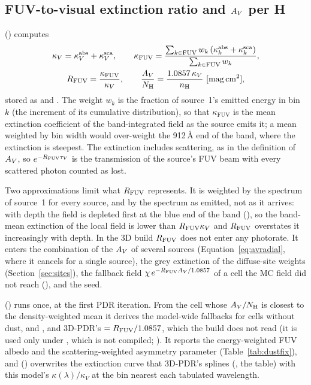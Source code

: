 \subsection{FUV-to-visual extinction ratio and \texorpdfstring{$A_{V}$}{AV} per H}

 () computes
\begin{gather}
  \kappa_V = \kappa^{\mathrm{abs}}_V + \kappa^{\mathrm{sca}}_V,\qquad
  \kappa_{\mathrm{FUV}} = \frac{\sum_{k\in\mathrm{FUV}} w_k\,(\kappa^{\mathrm{abs}}_k+\kappa^{\mathrm{sca}}_k)}{\sum_{k\in\mathrm{FUV}} w_k},
  \nonumber\\
  \RFUV = \frac{\kappa_{\mathrm{FUV}}}{\kappa_V},\qquad
  \frac{\AV}{N_{\mathrm H}} = \frac{1.0857\,\kappa_V}{n_{\mathrm H}}\ [\mathrm{mag\,cm^2}],
  \label{eq:rfuv}
\end{gather}
stored as  and . The weight $w_k$ is the
fraction of source~1's emitted energy in bin $k$ (the increment of its
cumulative distribution), so that $\kappa_{\mathrm{FUV}}$ is the mean
extinction coefficient of the band-integrated field as the source emits it; a
mean weighted by bin width would over-weight the 912\,\AA{} end of the band,
where the extinction is steepest. The extinction includes scattering, as in
the definition of $A_{V}$, so $e^{-R_{\mathrm{FUV}}\tau_V}$ is the transmission of the
source's FUV beam with every scattered photon counted as lost.

Two approximations limit what $R_{\mathrm{FUV}}$ represents. It is weighted by the
spectrum of source~1 for every source, and by the spectrum as emitted, not as
it arrives: with depth the field is depleted first at the blue end of the band
(), so the band-mean extinction of the local field is lower than
$R_{\mathrm{FUV}}\kappa_V$ and $R_{\mathrm{FUV}}$ overstates it increasingly with depth. In the 3D
build $R_{\mathrm{FUV}}$ does not enter any photorate. It enters the combination of the
$A_{V}$ of several sources (Equation~\ref{eq:avradial}, where it cancels for a
single source), the grey extinction of the diffuse-site weights
(Section~\ref{sec:sites}), the fallback field $\chi\,e^{-R_{\mathrm{FUV}}A_{V}/1.0857}$ of a
cell the MC field did not reach (), and the seed.

 () runs once, at the
first PDR iteration. From the cell whose $A_{V}/N_{\mathrm H}$ is closest to the
density-weighted mean it derives the model-wide fallbacks for cells without
dust,  and , and 3D-PDR's 
$=R_{\mathrm{FUV}}/1.0857$, which the build does not read (it is used only under
, which is not compiled; ).
It reports the energy-weighted FUV albedo and the scattering-weighted
asymmetry parameter (Table~\ref{tab:dustfix}), and () overwrites the
extinction curve that 3D-PDR's  splines (, the
\citet{SavageMathis1979} table) with this model's $\kappa(\lambda)/\kappa_V$
at the bin nearest each tabulated wavelength.


